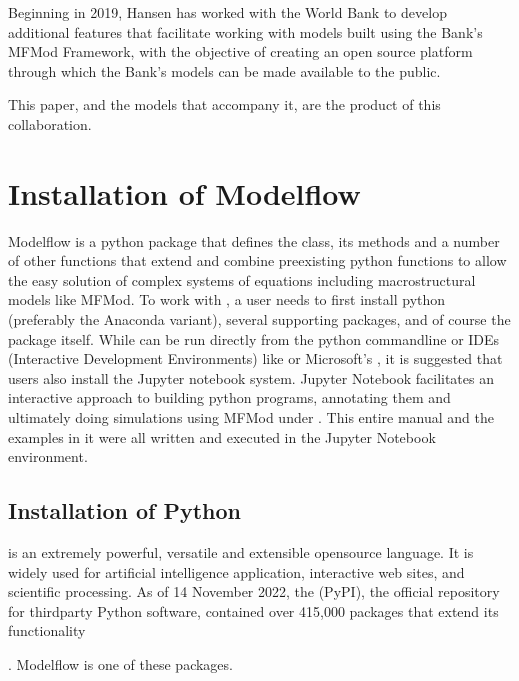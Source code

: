 \documentclass[letterpaper,10pt,english]{jupyterBook}
\begin{document}
\sphinxAtStartPar
Beginning in 2019, Hansen has worked with the World Bank to develop additional features that facilitate working with models built using the Bank’s MFMod Framework, with the objective of creating an open source platform through which the Bank’s models can be made available to the public.

\sphinxAtStartPar
This paper, and the models that accompany it, are the product of this collaboration.

\begin{sphinxShadowBox}
\sphinxstylesidebartitle{}
\end{sphinxShadowBox}

\sphinxstepscope


\section{Installation of Modelflow}
\label{\detokenize{content/03_Installation/InstallingPython:installation-of-modelflow}}\label{\detokenize{content/03_Installation/InstallingPython::doc}}
\sphinxAtStartPar
Modelflow is a python package that defines the  class, its methods and a number of other functions that extend and combine pre\sphinxhyphen{}existing python functions to allow the easy solution of complex systems of equations including macro\sphinxhyphen{}structural models like MFMod.  To work with , a user needs to first install python (preferably the Anaconda variant), several supporting packages, and of course the  package itself.  While  can be run directly from the python command\sphinxhyphen{}line or IDEs (Interactive Development Environments) like  or Microsoft’s , it is suggested that users also install the Jupyter notebook system. Jupyter Notebook facilitates an interactive approach to building python programs, annotating them and ultimately doing simulations using MFMod under . This entire manual and the examples in it were all written and executed in the Jupyter Notebook environment.


\subsection{Installation of Python}
\label{\detokenize{content/03_Installation/InstallingPython:installation-of-python}}
\sphinxAtStartPar
{} is an extremely powerful, versatile and extensible open\sphinxhyphen{}source language. It is widely used for artificial intelligence application, interactive web sites, and scientific processing. As of 14 November 2022, the  (PyPI), the official repository for third\sphinxhyphen{}party Python software, contained over 415,000 packages that extend its functionality %
\begin{footnote}[1]\sphinxAtStartFootnote
{}
%
\end{footnote}. Modelflow is one of these packages.
\end{document}
